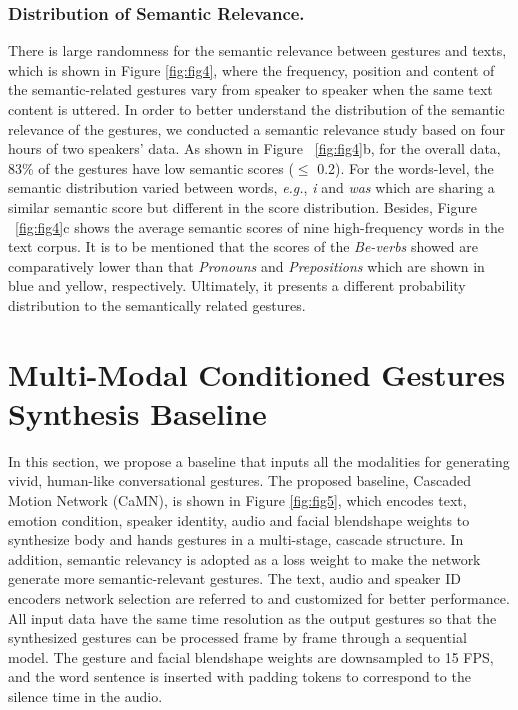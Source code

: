 \documentclass[runningheads]{llncs}
\begin{document}
\subsubsection{Distribution of Semantic Relevance.} 
There is large randomness for the semantic relevance between gestures and texts, which is shown in Figure \ref{fig:fig4}, where the frequency, position and content of the semantic-related gestures vary from speaker to speaker when the same text content is uttered. 
In order to better understand the distribution of the semantic relevance of the gestures, we conducted a semantic relevance study based on four hours of two speakers' data. 
As shown in Figure ~\ref{fig:fig4}b, for the overall data, 83\% of the gestures have low semantic scores ($\leq$ 0.2). 
For the words-level, the semantic distribution varied between words, \textit{e.g.}, \textit{i} and \textit{was} which are sharing a similar semantic score but different in the score distribution.
Besides, Figure ~\ref{fig:fig4}c shows the average semantic scores of nine high-frequency words in the text corpus. It is to be mentioned that the scores of the \textit{Be-verbs} showed are comparatively lower than that \textit{Pronouns} and \textit{Prepositions} which are shown in blue and yellow, respectively.
Ultimately, it presents a different probability distribution to the semantically related gestures.
 
\section{Multi-Modal Conditioned Gestures Synthesis Baseline }
\label{sec:method}
In this section, we propose a baseline that inputs all the modalities for generating vivid, human-like conversational gestures. 
The proposed baseline, Cascaded Motion Network (CaMN),  is shown in Figure \ref{fig:fig5}, which encodes text, emotion condition, speaker identity, audio and facial blendshape weights to synthesize body and hands gestures in a multi-stage, cascade structure. In addition, semantic relevancy is adopted as a loss weight to make the network generate more semantic-relevant gestures. 
The text, audio and speaker ID encoders network selection are referred to \cite{yoon2020speech} and customized for better performance.
All input data have the same time resolution as the output gestures so that the synthesized gestures can be processed frame by frame through a sequential model. The gesture and facial blendshape weights are downsampled to 15 FPS, and the word sentence is inserted with padding tokens to correspond to the silence time in the audio.   
\end{document}
